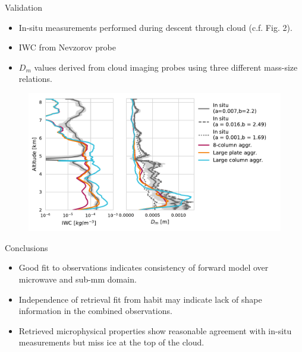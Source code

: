 \documentclass[8pt, final,hyperref={pdfpagelabels=false}]{beamer}
\begin{document}
\begin{frame}
\begin{columns}[t]
\begin{column}{.48\linewidth}
      \begin{block}{Validation}
        \begin{minipage}{0.5\textwidth}
          \begin{itemize}
            \item In-situ measurements performed during descent through cloud (c.f. Fig. 2).
            \item IWC from Nevzorov probe
          \item $D_m$ values derived from cloud imaging probes using three different
            mass-size relations.
          \end{itemize}%
          \end{minipage}%
          \begin{minipage}{0.5\textwidth}
            \begin{figure}
            \centering
            \hspace{-0.5cm}\includegraphics[width = \textwidth]{../plots/iwc_in_situ}
            \end{figure}
            \end{minipage}
      \end{block}
      \vspace{-0.5cm}

      \begin{block}{Conclusions}
        \begin{itemize}
          \item Good fit to observations indicates consistency of forward model over
            microwave and sub-mm domain.
          \item Independence of retrieval fit from habit may indicate lack of shape
               information in the combined observations.
          \item Retrieved microphysical properties show reasonable agreement with
            in-situ measurements but miss ice at the top of the cloud.
         \end{itemize}
      \end{block}
      \vspace{-0.5cm}


\end{column}
\end{columns}
\end{frame}
\end{document}
